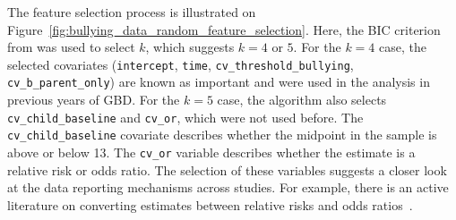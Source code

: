 The feature selection process is illustrated on Figure~\ref{fig:bullying_data_random_feature_selection}. 
Here, the BIC criterion from \cite{Jones2011} was used to select $k$, which suggests $k=4$ or $5$.  
 For the $k=4$ case, the selected covariates (\texttt{intercept}, \texttt{time}, \texttt{cv\_threshold\_bullying}, \texttt{cv\_b\_parent\_only}) 
are known as important and were used in the analysis in previous years of GBD. For the $k=5$ case, 
the algorithm also selects  \texttt{cv\_child\_baseline} and \texttt{cv\_or}, which were not used before. The  \texttt{cv\_child\_baseline} covariate describes whether the midpoint in the sample is above or below 13. 
The  \texttt{cv\_or} variable describes whether the estimate is a relative risk or odds ratio. The selection of these variables suggests a closer look at the data reporting mechanisms across studies. 
For example, there is an active literature on converting estimates between relative risks and odds ratios~\cite{grant2014converting,wang2013converting}.

